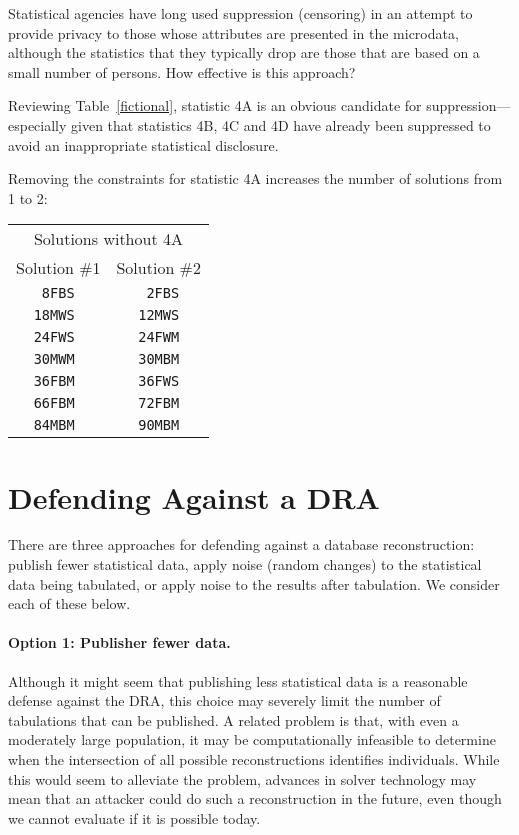 \documentclass[runningheads]{llncs}
\begin{document}
Statistical agencies have long used suppression (censoring) in an
attempt to provide privacy to those whose attributes are presented in
the microdata, although the statistics that they typically drop are
those that are based on a small number of persons. How effective is
this approach?

Reviewing Table~\ref{fictional}, statistic 4A is an obvious candidate
for suppression---especially given that statistics 4B, 4C and 4D have
already been suppressed to avoid an inappropriate statistical
disclosure.

Removing the constraints for statistic 4A increases the number of
solutions from 1 to 2:

\begin{center}
\begin{tabular}{c|c}
\multicolumn{2}{c}{Solutions without 4A}\\
  Solution \#1 & Solution \#2 \\
\hline
 \texttt{ 8FBS } &  \texttt{ 2FBS} \\
 \texttt{18MWS } &  \texttt{12MWS} \\
 \texttt{24FWS } &  \texttt{24FWM} \\
 \texttt{30MWM } &  \texttt{30MBM} \\
 \texttt{36FBM } &  \texttt{36FWS} \\
 \texttt{66FBM } &  \texttt{72FBM} \\
 \texttt{84MBM } &  \texttt{90MBM} \\
  \end{tabular}
\end{center}


\section{Defending Against a DRA}\label{solution}
There are three approaches for defending against a database reconstruction: publish fewer
statistical data, apply noise (random changes) to the
statistical data being tabulated, or apply noise to the results after
tabulation. We consider each of these below.

\paragraph{Option 1: Publisher fewer data.} Although it might seem that publishing less statistical data is a
reasonable defense against the DRA, this choice may severely limit the number
of tabulations that can be published. A
related problem is that, with even a moderately large population, it may be computationally infeasible to
determine when the intersection of all possible reconstructions
identifies individuals. While this would seem to alleviate the problem, advances in solver technology may mean that an attacker could do such a reconstruction in the future, even though we cannot evaluate if it is possible today.
\end{document}
